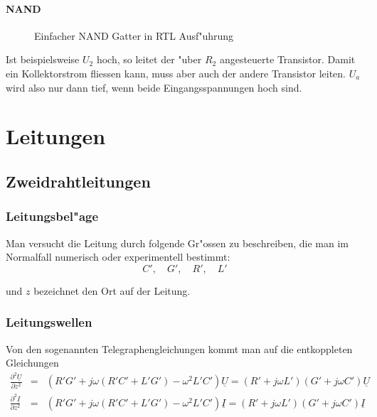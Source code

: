 \documentclass[german, 10pt, a4paper, headsepline]{scrreprt}
\theoremstyle{remark}
\begin{document}
\subsubsection{NAND}

\begin{figure}[hbt]
 
 \centerline{\box\graph}
 \caption{Einfacher NAND Gatter in RTL Ausf"uhrung}
 \label{digi_nand}
\end{figure}

Ist beispielsweise $U_2$ hoch, so leitet der "uber $R_2$ angesteuerte Transistor. Damit ein Kollektorstrom fliessen kann, muss aber auch der andere Transistor leiten. $U_a$ wird also nur dann tief, wenn beide Eingangsspannungen hoch sind.

\chapter{Leitungen}

\section{Zweidrahtleitungen}

\subsection{Leitungsbel"age}

Man versucht die Leitung durch folgende Gr"ossen zu beschreiben, die man im Normalfall numerisch oder experimentell bestimmt:
\begin{displaymath}
	C', \quad G', \quad R', \quad L'
\end{displaymath}

und $z$ bezeichnet den Ort auf der Leitung.

\subsection{Leitungswellen}

Von den sogenannten Telegraphengleichungen kommt man auf die entkoppleten Gleichungen
\begin{eqnarray}
	\frac{\partial^2 \underline{U}}{\partial z^2} &		= &	(R' G' + j\omega(R'C'+L'G') - \omega^2 L'C') \underline{U} = (R'+j\omega L')(G' + j\omega C')\underline{U} \nonumber \\
	\frac{\partial^2 \underline{I}}{\partial z^2} &		= &	(R' G' + j\omega(R'C'+L'G') - \omega^2 L'C') \underline{I} = (R'+j\omega L')(G' + j\omega C')\underline{I} \nonumber
\end{eqnarray}
\end{document}
